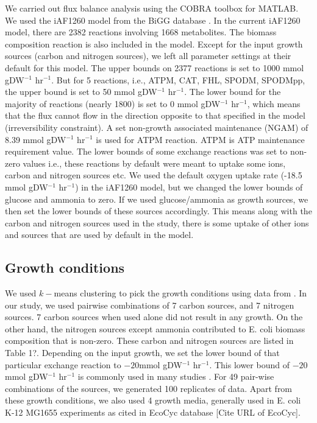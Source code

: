 \documentclass[12pt]{article}
\begin{document}
We carried out flux balance analysis using the COBRA toolbox \cite{Schellenbergeretal2011} for MATLAB. 
We used the iAF1260 model from the BiGG database \cite{Schellenbergeretal2010}. In the current iAF1260 model, there are 2382 reactions involving 1668 metabolites. The biomass composition reaction is also included in the model. Except for the input growth sources (carbon and nitrogen sources), we left all parameter settings at their default for this model. The upper bounds on 2377 reactions is set to 1000  mmol gDW$^{-1}$ hr$^{-1}$. But for 5 reactions, i.e., ATPM, CAT, FHL, SPODM, SPODMpp, the upper bound is set to 50 mmol gDW$^{-1}$ hr$^{-1}$. The lower bound for the majority of reactions (nearly 1800) is set to 0 mmol gDW$^{-1}$ hr$^{-1}$, which means that the flux cannot flow in the direction opposite to that specified in the model (irreversibility constraint). A set non-growth associated maintenance (NGAM) of 8.39  mmol gDW$^{-1}$ hr$^{-1}$ is used for ATPM reaction. ATPM is ATP maintenance requirement value. The lower bounds of some exchange reactions was set to non-zero values i.e., these reactions by default were meant to uptake some ions, carbon and nitrogen sources etc. We used the default oxygen uptake rate (-18.5 mmol gDW$^{-1}$ hr$^{-1}$) in the iAF1260 model, but we changed the lower bounds of glucose and ammonia to zero. If we used glucose/ammonia as growth sources, we then set the lower bounds of these sources accordingly. This means along with the carbon and nitrogen sources used in the study, there is some uptake of other ions and sources that are used by default in the model.


\subsection*{Growth conditions} 
We used $k-$means clustering to pick the growth conditions using data from \cite{Feistetal2007}. In our study, we used pairwise combinations of 7 carbon sources, and 7 nitrogen sources. 7 carbon sources when used alone did not result in any growth. On the other hand, the nitrogen sources except ammonia contributed to E. coli biomass composition that is non-zero. These carbon and nitrogen sources are listed in Table {\color{red}1?}. Depending on the input growth, we set the lower bound of that particular exchange reaction to $-20$mmol gDW$^{-1}$ hr$^{-1}$. This lower bound of $-20$mmol gDW$^{-1}$ hr$^{-1}$ is commonly used in many studies \cite{Feistetal2007}. For 49 pair-wise combinations of the sources, we generated 100 replicates of data. Apart from these growth conditions, we also used 4 growth media, generally used in E. coli K-12 MG1655 experiments as cited in EcoCyc database {\color{red}[Cite URL of EcoCyc]}.
\end{document}
